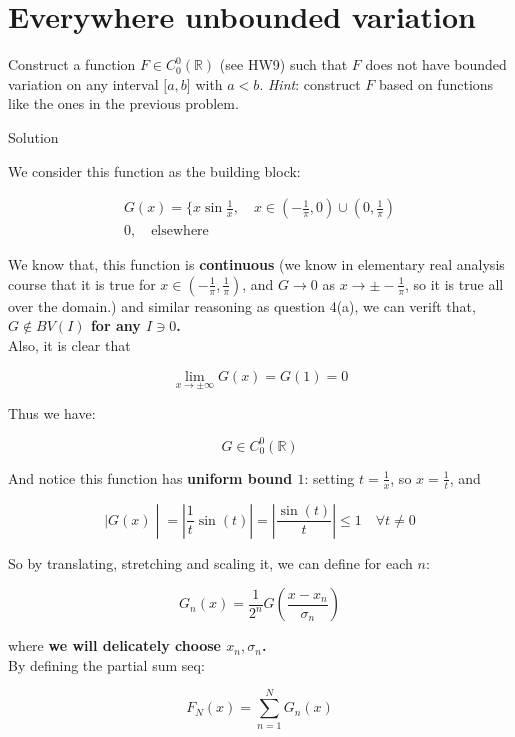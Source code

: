\documentclass{qlnotes-export}
\begin{document}
\section{Everywhere unbounded variation}\label{everywhere-unbounded-variation}

Construct a function \(F \in C_{0}^{0}({\mathbb{R}})\) (see HW9) such that \(F\) does not have bounded variation on any interval \(\lbrack a,b\rbrack\) with \(a < b\). \emph{Hint}: construct \(F\) based on functions like the ones in the previous problem.

\begin{qlsolution}{Solution}

We consider this function as the building block:

\[\begin{matrix}
{G(x) = \{ x\sin\frac{1}{x},\quad x \in ( - \frac{1}{\pi},0) \cup (0,\frac{1}{\pi})} \\
{0,\quad\text{elsewhere}}
\end{matrix}\]

We know that, this function is \textbf{continuous} (we know in elementary real analysis course that it is true for \(x \in ( - \frac{1}{\pi},\frac{1}{\pi})\), and \(G\rightarrow 0\) as \(x\rightarrow \pm - \frac{1}{\pi}\), so it is true all over the domain.) and similar reasoning as question 4(a), we can verift that, \textbf{\(G \notin BV(I)\) for any \(I \ni 0\).}\\
Also, it is clear that

\[\lim\limits_{x\rightarrow \pm \infty}G(x) = G(1) = 0\]

Thus we have:

\[G \in C_{0}^{0}({\mathbb{R}})\]

And notice this function has \textbf{uniform bound \(1\)}: setting \(t = \frac{1}{x}\), so \(x = \frac{1}{t}\), and

\[\left. |G(x) \middle| = \left| {\frac{1}{t}\sin(t)} \right| = \left| \frac{\sin(t)}{t} \right| \leq 1\quad\forall t \neq 0 \right.\]

So by translating, stretching and scaling it, we can define for each \(n\):

\[G_{n}(x) = \frac{1}{2^{n}}G(\frac{x - x_{n}}{\sigma_{n}})\]

where \textbf{we will delicately choose \(x_{n},\sigma_{n}\).}\\
By defining the partial sum seq:

\[F_{N}(x) = \sum\limits_{n = 1}^{N}G_{n}(x)\]


\end{qlsolution}
\end{document}
